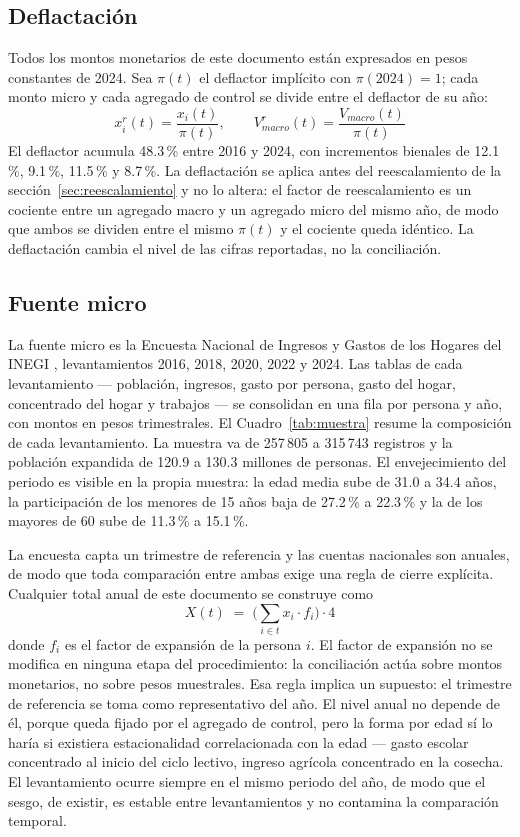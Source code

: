 \documentclass[11pt,a4paper]{article}
\begin{document}
\subsection{Deflactación}
Todos los montos monetarios de este documento están expresados en pesos constantes de 2024. Sea
$\pi(t)$ el deflactor implícito con $\pi(2024)=1$; cada monto micro y cada agregado de control se
divide entre el deflactor de su año:
\begin{equation}
\label{eq:deflactor}
x^{r}_i(t) = \frac{x_i(t)}{\pi(t)}, \qquad
V^{r}_{macro}(t) = \frac{V_{macro}(t)}{\pi(t)}
\end{equation}
El deflactor acumula 48.3\,\% entre 2016 y 2024, con incrementos bienales de 12.1\,\%, 9.1\,\%,
11.5\,\% y 8.7\,\%. La deflactación se aplica antes del reescalamiento de la
sección~\ref{sec:reescalamiento} y no lo altera: el factor de reescalamiento es un cociente entre
un agregado macro y un agregado micro del mismo año, de modo que ambos se dividen entre el mismo
$\pi(t)$ y el cociente queda idéntico. La deflactación cambia el nivel de las cifras reportadas,
no la conciliación.
\subsection{Fuente micro}
La fuente micro es la Encuesta Nacional de Ingresos y Gastos de los Hogares del INEGI
\citep{inegi_enigh}, levantamientos 2016, 2018, 2020, 2022 y 2024. Las tablas de cada
levantamiento --- población, ingresos, gasto por persona, gasto del hogar, concentrado del hogar
y trabajos --- se consolidan en una fila por persona y año, con montos en pesos
trimestrales. El Cuadro~\ref{tab:muestra} resume la composición de cada levantamiento. La muestra
va de 257\,805 a 315\,743 registros y la población expandida de 120.9 a 130.3 millones de
personas. El envejecimiento del periodo es visible en la propia muestra: la edad media sube de
31.0 a 34.4 años, la participación de los menores de 15 años baja de 27.2\,\% a 22.3\,\% y la de
los mayores de 60 sube de 11.3\,\% a 15.1\,\%.

La encuesta capta un trimestre de referencia y las cuentas nacionales son anuales, de modo que
toda comparación entre ambas exige una regla de cierre explícita. Cualquier total anual de este
documento se construye como
\begin{equation}
\label{eq:cierre}
X(t) \;=\; \Big(\sum_{i \in t} x_i \cdot f_i\Big) \cdot 4
\end{equation}
donde $f_i$ es el factor de expansión de la persona $i$. El factor de expansión no se modifica en
ninguna etapa del procedimiento: la conciliación actúa sobre montos monetarios, no sobre pesos
muestrales.
Esa regla implica un supuesto: el trimestre de referencia se toma como representativo del año.
El nivel anual no depende de él, porque queda fijado por el agregado
de control, pero la forma por edad sí lo haría si existiera estacionalidad correlacionada con la
edad --- gasto escolar concentrado al inicio del ciclo lectivo, ingreso agrícola concentrado en la
cosecha. El levantamiento ocurre siempre en el mismo periodo del año, de modo que el sesgo, de
existir, es estable entre levantamientos y no contamina la comparación temporal.
\end{document}
